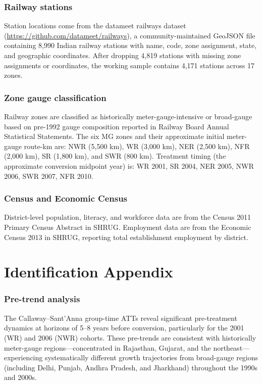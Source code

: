 \documentclass[12pt]{article}
\begin{document}
\subsubsection*{Railway stations} Station locations come from the datameet railways dataset (\url{https://github.com/datameet/railways}), a community-maintained GeoJSON file containing 8,990 Indian railway stations with name, code, zone assignment, state, and geographic coordinates. After dropping 4,819 stations with missing zone assignments or coordinates, the working sample contains 4,171 stations across 17 zones.

\subsubsection*{Zone gauge classification} Railway zones are classified as historically meter-gauge-intensive or broad-gauge based on pre-1992 gauge composition reported in Railway Board Annual Statistical Statements. The six MG zones and their approximate initial meter-gauge route-km are: NWR (5,500 km), WR (3,000 km), NER (2,500 km), NFR (2,000 km), SR (1,800 km), and SWR (800 km). Treatment timing (the approximate conversion midpoint year) is: WR 2001, SR 2004, NER 2005, NWR 2006, SWR 2007, NFR 2010.

\subsubsection*{Census and Economic Census} District-level population, literacy, and workforce data are from the Census 2011 Primary Census Abstract in SHRUG. Employment data are from the Economic Census 2013 in SHRUG, reporting total establishment employment by district.

\section{Identification Appendix}

\subsubsection*{Pre-trend analysis} The Callaway--Sant'Anna group-time ATTs reveal significant pre-treatment dynamics at horizons of 5--8 years before conversion, particularly for the 2001 (WR) and 2006 (NWR) cohorts. These pre-trends are consistent with historically meter-gauge regions---concentrated in Rajasthan, Gujarat, and the northeast---experiencing systematically different growth trajectories from broad-gauge regions (including Delhi, Punjab, Andhra Pradesh, and Jharkhand) throughout the 1990s and 2000s.
\end{document}
